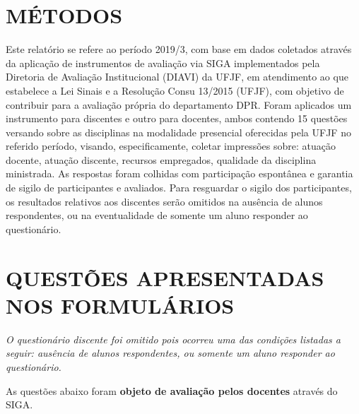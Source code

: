 \documentclass[a4paper,10pt]{article}
\begin{document}
\section{MÉTODOS}
Este relatório se refere ao período 2019/3, com base em dados     coletados através da aplicação de instrumentos de avaliação via SIGA     implementados pela Diretoria de Avaliação Institucional (DIAVI) da UFJF, em atendimento     ao que estabelece a Lei Sinais e a Resolução Consu 13/2015 (UFJF),     com objetivo de contribuir para a avaliação própria do departamento DPR.    Foram aplicados um instrumento para discentes e outro para docentes, ambos contendo     15 questões versando sobre as disciplinas na modalidade presencial oferecidas pela UFJF no     referido período, visando, especificamente, coletar impressões sobre: atuação docente, atuação discente,     recursos empregados, qualidade da disciplina ministrada.     As respostas foram colhidas      com participação espontânea e garantia de    sigilo de participantes e avaliados. Para resguardar o sigilo dos participantes, os resultados relativos aos discentes serão omitidos na ausência de alunos respondentes, ou na eventualidade de somente um aluno responder ao questionário.
\section{QUESTÕES APRESENTADAS NOS FORMULÁRIOS}
{ \it O questionário discente foi omitido pois ocorreu uma das condições listadas a seguir: ausência de alunos respondentes, ou somente um aluno responder ao questionário.}

As questões abaixo foram {\bf objeto de avaliação pelos docentes} através do SIGA.
\end{document}
